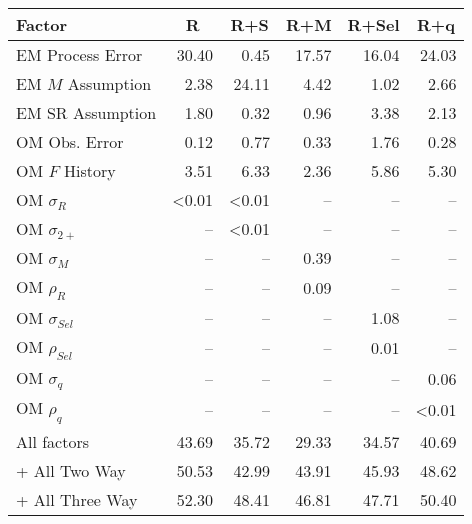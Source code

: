\begin{center}
\begin{tabular}{lrrrrr}
\hline\hline
\multicolumn{1}{l}{Factor}&\multicolumn{1}{c}{R}&\multicolumn{1}{c}{R+S}&\multicolumn{1}{c}{R+M}&\multicolumn{1}{c}{R+Sel}&\multicolumn{1}{c}{R+q}\tabularnewline
\hline
EM Process Error&30.40& 0.45&17.57&16.04&24.03\tabularnewline
EM $M$ Assumption& 2.38&24.11& 4.42& 1.02& 2.66\tabularnewline
EM SR Assumption& 1.80& 0.32& 0.96& 3.38& 2.13\tabularnewline
OM Obs. Error& 0.12& 0.77& 0.33& 1.76& 0.28\tabularnewline
OM $F$ History& 3.51& 6.33& 2.36& 5.86& 5.30\tabularnewline
OM $\sigma_R$&\textless  0.01&\textless  0.01&--&--&--\tabularnewline
OM $\sigma_{2+}$ &--&\textless  0.01&--&--&--\tabularnewline
OM $\sigma_M$&--&--& 0.39&--&--\tabularnewline
OM $\rho_R$&--&--& 0.09&--&--\tabularnewline
OM $\sigma_{Sel}$&--&--&--& 1.08&--\tabularnewline
OM $\rho_{Sel}$&--&--&--& 0.01&--\tabularnewline
OM $\sigma_q$&--&--&--&--& 0.06\tabularnewline
OM $\rho_q$&--&--&--&--&\textless  0.01\tabularnewline
All factors&43.69&35.72&29.33&34.57&40.69\tabularnewline
+ All Two Way&50.53&42.99&43.91&45.93&48.62\tabularnewline
+ All Three Way&52.30&48.41&46.81&47.71&50.40\tabularnewline
\hline
\end{tabular}\end{center}
